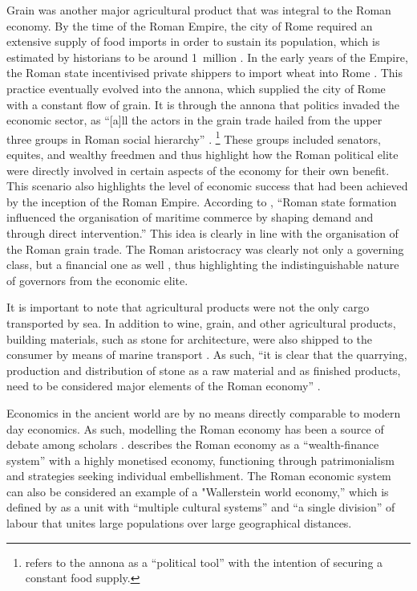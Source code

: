 

Grain was another major agricultural product that was integral to the Roman economy. By the time of the Roman Empire, the city of Rome required an extensive supply of food imports in order to sustain its population, which is estimated by historians to be around 1~million \parencite[315]{Kessler_2007}. In the early years of the Empire, the Roman state incentivised private shippers to import wheat into Rome \parencite[47]{Kehoe_2013}. This practice eventually evolved into the annona, which supplied the city of Rome with a constant flow of grain. It is through the annona that politics invaded the economic sector, as “[a]ll the actors in the grain trade hailed from the upper three groups in Roman social hierarchy” \parencite[317]{Kessler_2007}.
\footnote{\textcite[289]{Wilson_2012} refers to the annona as a “political tool” with the intention of securing a constant food supply.} These groups included senators, equites, and wealthy freedmen and thus highlight how the Roman political elite were directly involved in certain aspects of the economy for their own benefit. This scenario also highlights the level of economic success that had been achieved by the inception of the Roman Empire. According to \textcite[14]{Scheidel_2009a}, “Roman state formation influenced the organisation of maritime commerce by shaping demand and through direct intervention.” This idea is clearly in line with the organisation of the Roman grain trade. The Roman aristocracy was clearly not only a governing class, but a financial one as well \parencite[235]{Adams_2012}, thus highlighting the indistinguishable nature of governors from the economic elite. 

It is important to note that agricultural products were not the only cargo transported by sea. In addition to wine, grain, and other agricultural products, building materials, such as stone for architecture, were also shipped to the consumer by means of marine transport \parencite[150]{Russell_2011}. As such, “it is clear that the quarrying, production and distribution of stone as a raw material and as finished products, need to be considered major elements of the Roman economy”  \parencite[151]{Russell_2011}.

Economics in the ancient world are by no means directly comparable to modern day economics. As such, modelling the Roman economy has been a source of debate among scholars \parencites{Finley_1999}{Hopkins_1980}{Storey_2004}{Woolf_1990}{Woolf_1992}. \textcite[126]{Storey_2004} describes the Roman economy as a “wealth-finance system” with a highly monetised economy, functioning through patrimonialism and strategies seeking individual embellishment. The Roman economic system can also be considered an example of a "Wallerstein world economy,” which is defined by \textcite[44]{Woolf_1990} as a unit with “multiple cultural systems” and “a single division” of labour that unites large populations over large geographical distances.

